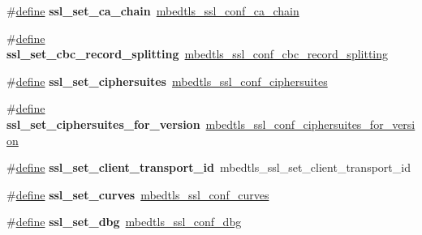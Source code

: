 \begin{DoxyCompactItemize}
\item 
\mbox{\label{compat-1_83_8h_a965b8193c4d4398560444b62e2d6422f}} 
\#\hyperlink{structdefine}{define} {\bfseries ssl\+\_\+set\+\_\+ca\+\_\+chain}~\hyperlink{ssl_8h_a85c3bb6b682ba361d13de1c0a1eb69fb}{mbedtls\+\_\+ssl\+\_\+conf\+\_\+ca\+\_\+chain}
\item 
\mbox{\label{compat-1_83_8h_ac3f591f1b1d5d2cb5ea6f2093ae87398}} 
\#\hyperlink{structdefine}{define} {\bfseries ssl\+\_\+set\+\_\+cbc\+\_\+record\+\_\+splitting}~\hyperlink{ssl_8h_a2cafaf0e79682a1152838d4991b59e23}{mbedtls\+\_\+ssl\+\_\+conf\+\_\+cbc\+\_\+record\+\_\+splitting}
\item 
\mbox{\label{compat-1_83_8h_ab3b2668e6ebd6098cead11e3d14a4dc2}} 
\#\hyperlink{structdefine}{define} {\bfseries ssl\+\_\+set\+\_\+ciphersuites}~\hyperlink{ssl_8h_ac8e4df37cadda8f743ed45501a51fec1}{mbedtls\+\_\+ssl\+\_\+conf\+\_\+ciphersuites}
\item 
\mbox{\label{compat-1_83_8h_aa294ed60dde14ef2f96cac9bed849532}} 
\#\hyperlink{structdefine}{define} {\bfseries ssl\+\_\+set\+\_\+ciphersuites\+\_\+for\+\_\+version}~\hyperlink{ssl_8h_aa597f5461c48ee6014397c926916e6ae}{mbedtls\+\_\+ssl\+\_\+conf\+\_\+ciphersuites\+\_\+for\+\_\+version}
\item 
\mbox{\label{compat-1_83_8h_ad3e6b35cb74d434602b3786f0058d52e}} 
\#\hyperlink{structdefine}{define} {\bfseries ssl\+\_\+set\+\_\+client\+\_\+transport\+\_\+id}~mbedtls\+\_\+ssl\+\_\+set\+\_\+client\+\_\+transport\+\_\+id
\item 
\mbox{\label{compat-1_83_8h_a32e6e698dfaa88654eda50f50d61a362}} 
\#\hyperlink{structdefine}{define} {\bfseries ssl\+\_\+set\+\_\+curves}~\hyperlink{ssl_8h_ae1d705b8fc48224262ab92eb5aa4598c}{mbedtls\+\_\+ssl\+\_\+conf\+\_\+curves}
\item 
\mbox{\label{compat-1_83_8h_aeedf34eff8f4aec44c2f18375f4952da}} 
\#\hyperlink{structdefine}{define} {\bfseries ssl\+\_\+set\+\_\+dbg}~\hyperlink{ssl_8h_ab15dcbe7c7fe2a5c118e7c486c07c921}{mbedtls\+\_\+ssl\+\_\+conf\+\_\+dbg}
\item 
\mbox{\label{compat-1_83_8h_ab0ff0b1b033dd6e7cd7d86070dc7348b}} 

\end{DoxyCompactItemize}
